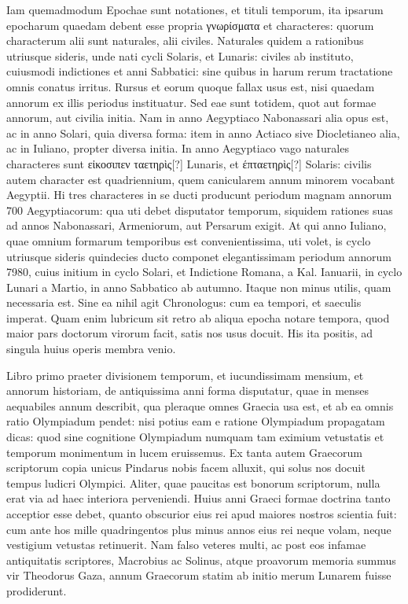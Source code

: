 Iam quemadmodum Epochae
sunt notationes, et tituli temporum, ita ipsarum epocharum
quaedam debent esse propria \textgreek{γνωρίσματα} et characteres: quorum
characterum alii sunt naturales, alii civiles. 
Naturales quidem a rationibus
utriusque sideris, unde nati cycli Solaris, et Lunaris: civiles
ab instituto, cuiusmodi indictiones et anni Sabbatici: sine quibus in
harum rerum tractatione omnis conatus irritus. 
Rursus et eorum
quoque fallax usus est, nisi quaedam annorum ex illis periodus instituatur.
Sed eae sunt totidem, quot aut formae annorum, aut civilia
initia.
Nam in anno Aegyptiaco Nabonassari alia opus est, ac in anno
Solari, quia diversa forma: item in anno Actiaco sive Diocletianeo
alia, ac in Iuliano, propter diversa initia.
In anno Aegyptiaco vago
naturales characteres sunt \textgreek{εἰκοσιπεν ταετηρὶς[?]} Lunaris, et
\textgreek{έπταετηρὶς[?]} Solaris:
civilis autem character est quadriennium, quem canicularem
annum minorem vocabant Aegyptii.
Hi tres characteres in se ducti
producunt periodum magnam annorum 700 Aegyptiacorum: qua
uti debet disputator temporum, siquidem rationes suas ad annos
Nabonassari, Armeniorum, aut Persarum exigit.
At qui anno Iuliano,
quae omnium formarum temporibus est convenientissima, uti
volet, is cyclo utriusque sideris quindecies ducto componet elegantissimam
periodum annorum 7980, cuius initium in cyclo Solari,
et Indictione Romana, a Kal. Ianuarii, in cyclo Lunari a Martio, in
anno Sabbatico ab autumno.
Itaque non minus utilis, quam necessaria
est.
Sine ea nihil agit Chronologus: cum ea tempori, et saeculis
imperat.
Quam enim lubricum sit retro ab aliqua epocha notare tempora,
quod maior pars doctorum virorum facit, satis nos usus docuit.
His ita positis, ad singula huius operis membra venio.

Libro primo
praeter divisionem temporum, et iucundissimam mensium, et
annorum historiam, de antiquissima anni forma disputatur, quae in
menses aequabiles annum describit, qua pleraque omnes Graecia usa
est, et ab ea omnis ratio Olympiadum pendet: nisi potius eam e ratione
Olympiadum propagatam dicas: quod sine cognitione Olympiadum
numquam tam eximium vetustatis et temporum monimentum
in lucem eruissemus. 
Ex tanta autem Graecorum scriptorum
copia unicus Pindarus nobis facem alluxit, qui solus nos docuit tempus
ludicri Olympici.
Aliter, quae paucitas est bonorum scriptorum,
nulla erat via ad haec interiora perveniendi.
Huius anni Graeci
formae doctrina tanto acceptior esse debet, quanto obscurior eius
rei apud maiores nostros scientia fuit: cum ante hos mille quadringentos
plus minus annos eius rei neque volam, neque vestigium
vetustas retinuerit.
Nam falso veteres multi, ac post eos infamae antiquitatis
scriptores, Macrobius ac Solinus, atque proavorum memoria
summus vir Theodorus Gaza, annum Graecorum statim
ab initio merum Lunarem fuisse prodiderunt.

